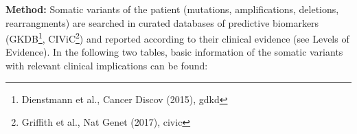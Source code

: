 \documentclass[9pt]{article}\usepackage[]{graphicx}\usepackage[table,dvipsnames]{xcolor}
\begin{document}
\fontsize{8}{9}\selectfont
\textbf{Method:} Somatic variants of the patient (mutations, amplifications, deletions, rearrangments) are searched in curated databases of predictive biomarkers (GKDB\footnote{Dienstmann et al., Cancer Discov (2015), gdkd}, CIViC\footnote{Griffith et al., Nat Genet (2017), civic}) and reported according to their clinical evidence (see Levels of Evidence). In the following two tables, basic information of the somatic variants with relevant clinical implications can be found: \\

\vspace{-0.5cm}

\begingroup\fontsize{8pt}{10pt}\selectfont
\end{document}
